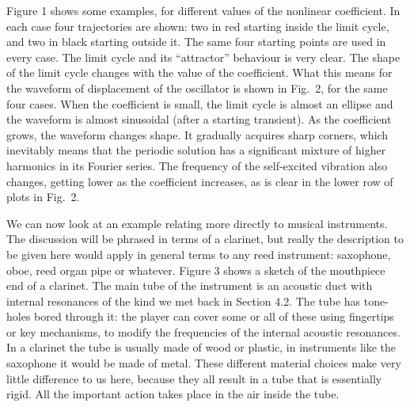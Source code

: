   Figure 1 shows some examples, for different values of the nonlinear 
  coefficient. In each case four trajectories are shown: two in red starting 
  inside the limit cycle, and two in black starting outside it. The same four 
  starting points are used in every case. The limit cycle and its ``attractor'' 
  behaviour is very clear. The shape of the limit cycle changes with the value 
  of the coefficient. What this means for the waveform of displacement of the 
  oscillator is shown in Fig.\ 2, for the same four cases. When the coefficient 
  is small, the limit cycle is almost an ellipse and the waveform is almost 
  sinusoidal (after a starting transient). As the coefficient grows, the 
  waveform changes shape. It gradually acquires sharp corners, which inevitably 
  means that the periodic solution has a significant mixture of higher 
  harmonics in its Fourier series. The frequency of the self-excited vibration 
  also changes, getting lower as the coefficient increases, as is clear in the 
  lower row of plots in Fig.\ 2. 









  We can now look at an example relating more directly to musical instruments. 
  The discussion will be phrased in terms of a clarinet, but really the 
  description to be given here would apply in general terms to any reed 
  instrument: saxophone, oboe, reed organ pipe or whatever. Figure 3 shows a 
  sketch of the mouthpiece end of a clarinet. The main tube of the instrument 
  is an acoustic duct with internal resonances of the kind we met back in 
  Section 4.2. The tube has tone-holes bored through it: the player can cover 
  some or all of these using fingertips or key mechanisms, to modify the 
  frequencies of the internal acoustic resonances. In a clarinet the tube is 
  usually made of wood or plastic, in instruments like the saxophone it would 
  be made of metal. These different material choices make very little 
  difference to us here, because they all result in a tube that is essentially 
  rigid. All the important action takes place in the air inside the tube. 

